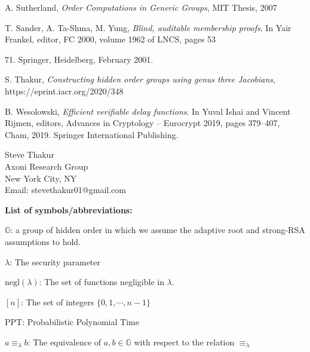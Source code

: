 \documentclass[11pt, lettersize, notitlepage, leqno, footskip=0.6cm]{article}
\newcommand{\negl}{\mr{negl}}
\newcommand{\eqlam}{\equiv_{\lam}}
\newcommand{\mb}{\mathbb}
\newcommand{\mr}{\mathrm}
\newcommand{\lam}{\lambda}
\newcommand{\noin}{\noindent}
\numberwithin{equation}{section}
\begin{document}
\noindent [Sut07] A. Sutherland, \textit{Order Computations in Generic Groups}, MIT Thesis, 2007 \vspace{0.1cm}

\noindent [STY01] T. Sander, A. Ta-Shma, M. Yung, \textit{Blind, auditable membership proofs}, In Yair Frankel, editor, FC 2000, volume 1962 of LNCS, pages 53{71. Springer, Heidelberg, February 2001.\vspace{0.1cm}


\noindent [Th20] S. Thakur, \textit{Constructing hidden order groups using genus three Jacobians}, https://eprint.iacr.org/2020/348\vspace{0.1cm} 

\noindent [Wes19] B. Wesolowski, \textit{Efficient verifiable delay functions}. In Yuval Ishai and Vincent Rijmen, editors, Advances in Cryptology – Eurocrypt 2019, pages 379–407, Cham, 2019. Springer International Publishing.\vspace{0.1cm}




\bigskip

\normalsize
\noindent Steve Thakur\\
Axoni Research Group\\
New York City, NY\\
Email: stevethakur01@gmail.com



\normalsize

\bigskip
\bigskip
\bigskip
\bigskip
\bigskip
\bigskip


\begin{center}\textbf{List of symbols/abbreviations:}\end{center}

\noindent $\mb{G}$: a group of hidden order in which we assume the adaptive root and strong-RSA assumptions to hold.

\noindent $\lam$: The security parameter

\noindent $\negl(\lam)$: The set of functions negligible in $\lam$.

\noindent $[n]$: The set of integers $\{0,1,\cdots,n-1 \}$

\noin PPT: Probabilistic Polynomial Time

\noindent $a\eqlam b$: The equivalence of $a,b\in\mb{G}$ with respect to the relation $\eqlam$

}
\end{document}
